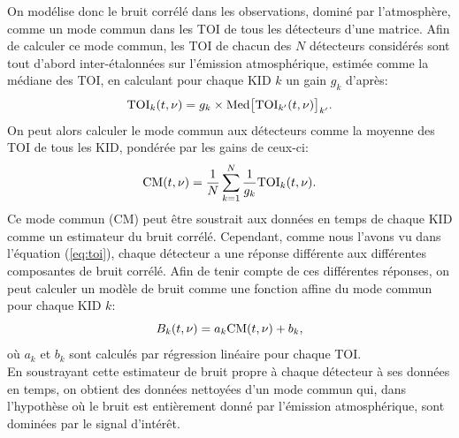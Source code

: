 On modélise donc le bruit corrélé dans les observations, dominé par l'atmosphère, comme un mode commun dans les TOI de tous les détecteurs d'une matrice.
Afin de calculer ce mode commun, les TOI de chacun des $N$ détecteurs considérés sont tout d'abord inter-étalonnées sur l'émission atmosphérique, estimée comme la médiane des TOI, en calculant pour chaque KID $k$ un gain $g_k$ d'après:
\begin{equation}
    \label{eq:toi_median}
    {\rm TOI}_k(t, \nu) = g_k \times {\rm Med} \big[{\rm TOI}_{k'}(t, \nu)\big]_{k'}.
\end{equation}
On peut alors calculer le mode commun aux détecteurs comme la moyenne des TOI de tous les KID, pondérée par les gains de ceux-ci:
\begin{equation}
    \label{eq:toi_CM}
    {\rm CM}(t, \nu) = \frac{1}{N} \sum_{k=1}^N \frac{1}{g_k} {\rm TOI}_k(t, \nu).
\end{equation}
Ce mode commun (CM)  peut être soustrait aux données en temps de chaque KID comme un estimateur du bruit corrélé.
Cependant, comme nous l'avons vu dans l'équation (\ref{eq:toi}), chaque détecteur a une réponse différente aux différentes composantes de bruit corrélé.
Afin de tenir compte de ces différentes réponses, on peut calculer un modèle de bruit comme une fonction affine du mode commun pour chaque KID $k$:
\begin{equation}
    \label{eq:toi_noise_CM}
    B_k(t, \nu) = a_k {\rm CM}(t, \nu) + b_k,
\end{equation}
où $a_k$ et $b_k$ sont calculés par régression linéaire pour chaque TOI. \\
En soustrayant cette estimateur de bruit propre à chaque détecteur à ses données en temps, on obtient des données nettoyées d'un mode commun qui, dans l'hypothèse où le bruit est entièrement donné par l'émission atmosphérique, sont dominées par le signal d'intérêt.

